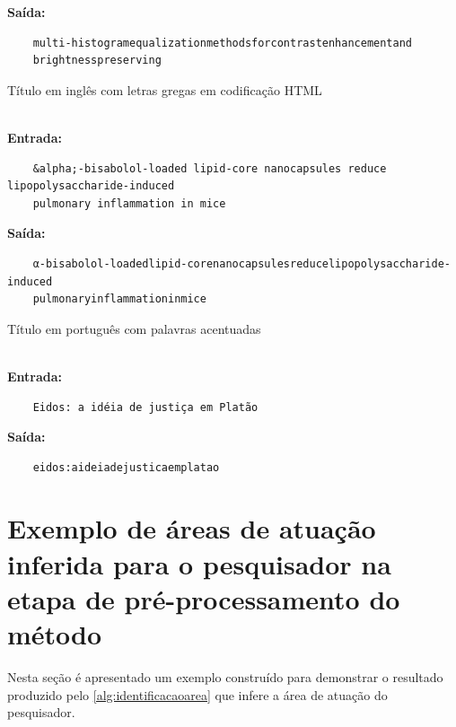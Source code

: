 \begin{apendicesenv}
\begin{example}
\begin{ABNTEXfontereduzida}
\noindent \textbf{Saída:}
\begin{verbatim}
    multi-histogramequalizationmethodsforcontrastenhancementand
    brightnesspreserving
\end{verbatim}
\end{ABNTEXfontereduzida}
\end{example}

\begin{example}
Título em inglês com letras gregas em codificação HTML
\begin{ABNTEXfontereduzida}
\\ \noindent \textbf{Entrada:}
\begin{verbatim}
    &alpha;-bisabolol-loaded lipid-core nanocapsules reduce lipopolysaccharide-induced 
    pulmonary inflammation in mice
\end{verbatim}

\noindent \textbf{Saída:}
\begin{verbatim}
    α-bisabolol-loadedlipid-corenanocapsulesreducelipopolysaccharide-induced
    pulmonaryinflammationinmice
\end{verbatim}
\end{ABNTEXfontereduzida}
\end{example}

\begin{example}
Título em português com palavras acentuadas
\begin{ABNTEXfontereduzida}
\\ \noindent \textbf{Entrada:}
\begin{verbatim}
    Eidos: a idéia de justiça em Platão
\end{verbatim}

\noindent \textbf{Saída:}
\begin{verbatim}
    eidos:aideiadejusticaemplatao
\end{verbatim}
\end{ABNTEXfontereduzida}
\end{example}


\chapter{Exemplo de áreas de atuação inferida para o pesquisador na etapa de pré-processamento do método}

Nesta seção é apresentado um exemplo construído para demonstrar o resultado produzido pelo \autoref{alg:identificacaoarea} que infere a área de atuação do pesquisador.


\end{apendicesenv}
